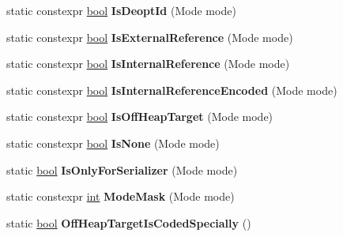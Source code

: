 \begin{DoxyCompactItemize}
static constexpr \mbox{\hyperlink{classbool}{bool}} {\bfseries Is\+Deopt\+Id} (Mode mode)
\item 
\mbox{\label{classv8_1_1internal_1_1RelocInfo_aa23bd20c400df93240be7af19f41e4af}} 
static constexpr \mbox{\hyperlink{classbool}{bool}} {\bfseries Is\+External\+Reference} (Mode mode)
\item 
\mbox{\label{classv8_1_1internal_1_1RelocInfo_a295c7ff71d6f39d3cf481caa1ea778e7}} 
static constexpr \mbox{\hyperlink{classbool}{bool}} {\bfseries Is\+Internal\+Reference} (Mode mode)
\item 
\mbox{\label{classv8_1_1internal_1_1RelocInfo_a580a152f238b64eeb3c731fd5fec4727}} 
static constexpr \mbox{\hyperlink{classbool}{bool}} {\bfseries Is\+Internal\+Reference\+Encoded} (Mode mode)
\item 
\mbox{\label{classv8_1_1internal_1_1RelocInfo_a2af1f7effb64e4c166216072b315a714}} 
static constexpr \mbox{\hyperlink{classbool}{bool}} {\bfseries Is\+Off\+Heap\+Target} (Mode mode)
\item 
\mbox{\label{classv8_1_1internal_1_1RelocInfo_abbce0c52fa5db29c25a1fc8dafb4460f}} 
static constexpr \mbox{\hyperlink{classbool}{bool}} {\bfseries Is\+None} (Mode mode)
\item 
\mbox{\label{classv8_1_1internal_1_1RelocInfo_a130c6a33506ee2241439cb37808268fa}} 
static \mbox{\hyperlink{classbool}{bool}} {\bfseries Is\+Only\+For\+Serializer} (Mode mode)
\item 
\mbox{\label{classv8_1_1internal_1_1RelocInfo_a4bb9ca8ff590a4b9a46751997f9f9c5e}} 
static constexpr \mbox{\hyperlink{classint}{int}} {\bfseries Mode\+Mask} (Mode mode)
\item 
\mbox{\label{classv8_1_1internal_1_1RelocInfo_ac7db3ae941dbcb503530247f26b4eb19}} 
static \mbox{\hyperlink{classbool}{bool}} {\bfseries Off\+Heap\+Target\+Is\+Coded\+Specially} ()
\item 
\mbox{\label{classv8_1_1internal_1_1RelocInfo_a9f926d469464d32bcf11639a600e9a01}} 

\end{DoxyCompactItemize}
